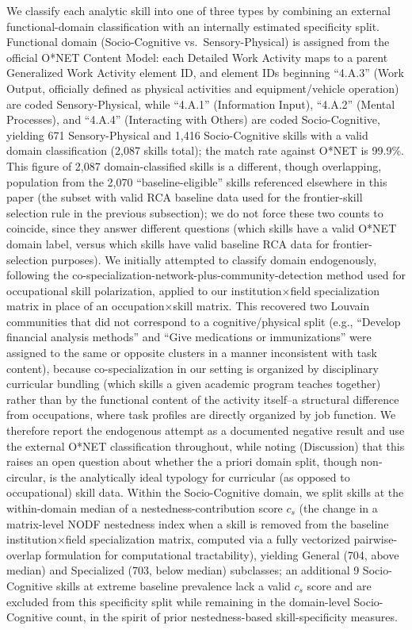 \documentclass[11pt, letterpaper]{article}
\begin{document}
We classify each analytic skill into one of three types by combining an external functional-domain classification with an internally estimated specificity split. Functional domain (Socio-Cognitive vs.\ Sensory-Physical) is assigned from the official O*NET Content Model: each Detailed Work Activity maps to a parent Generalized Work Activity element ID, and element IDs beginning ``4.A.3'' (Work Output, officially defined as physical activities and equipment/vehicle operation) are coded Sensory-Physical, while ``4.A.1'' (Information Input), ``4.A.2'' (Mental Processes), and ``4.A.4'' (Interacting with Others) are coded Socio-Cognitive, yielding 671 Sensory-Physical and 1,416 Socio-Cognitive skills with a valid domain classification (2,087 skills total); the match rate against O*NET is 99.9\%. This figure of 2,087 domain-classified skills is a different, though overlapping, population from the 2,070 ``baseline-eligible'' skills referenced elsewhere in this paper (the subset with valid RCA baseline data used for the frontier-skill selection rule in the previous subsection); we do not force these two counts to coincide, since they answer different questions (which skills have a valid O*NET domain label, versus which skills have valid baseline RCA data for frontier-selection purposes). We initially attempted to classify domain endogenously, following the co-specialization-network-plus-community-detection method used for occupational skill polarization, applied to our institution$\times$field specialization matrix in place of an occupation$\times$skill matrix. This recovered two Louvain communities that did not correspond to a cognitive/physical split (e.g., ``Develop financial analysis methods'' and ``Give medications or immunizations'' were assigned to the same or opposite clusters in a manner inconsistent with task content), because co-specialization in our setting is organized by disciplinary curricular bundling (which skills a given academic program teaches together) rather than by the functional content of the activity itself--a structural difference from occupations, where task profiles are directly organized by job function. We therefore report the endogenous attempt as a documented negative result and use the external O*NET classification throughout, while noting (Discussion) that this raises an open question about whether the a priori domain split, though non-circular, is the analytically ideal typology for curricular (as opposed to occupational) skill data. Within the Socio-Cognitive domain, we split skills at the within-domain median of a nestedness-contribution score $c_s$ (the change in a matrix-level NODF nestedness index when a skill is removed from the baseline institution$\times$field specialization matrix, computed via a fully vectorized pairwise-overlap formulation for computational tractability), yielding General (704, above median) and Specialized (703, below median) subclasses; an additional 9 Socio-Cognitive skills at extreme baseline prevalence lack a valid $c_s$ score and are excluded from this specificity split while remaining in the domain-level Socio-Cognitive count, in the spirit of prior nestedness-based skill-specificity measures.
\end{document}

